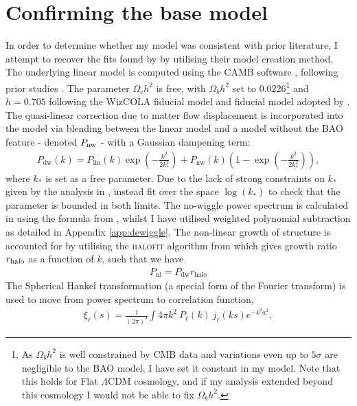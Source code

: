\documentclass[titlesmallcaps, examinerscopy, copyrightpage]{uqthesis}
\begin{document}
\section{Confirming the base model}

In order to determine whether my model was consistent with prior literature, I attempt to recover the fits found by \citet{BlakeKazin2011} by utilising their model creation method. The underlying linear model is computed using the CAMB software \citep{Lewis2000}, following prior studies \citep{BlakeDavis2011, SanchezScoccola2012, ChuangWang2012}. The parameter $\Omega_c h^2$ is free, with $\Omega_b h^2$ set to $0.0226$\footnote{As $\Omega_b h^2$ is well constrained by CMB data and variations even up to $5\sigma$ are negligible to the BAO model, I have set it constant in my model. Note that this holds for Flat $\Lambda$CDM cosmology, and if my analysis extended beyond this cosmology I would not be able to fix $\Omega_b h^2$.} and $h=0.705$ following the WizCOLA fiducial model and fiducial model adopted by \citet{BlakeKazin2011}. The quasi-linear correction due to matter flow displacement is incorporated into the model via blending between the linear model and a model without the BAO feature - denoted $P_{\rm{nw}}$ - with a Gaussian dampening term:
\begin{align}
P_{\text{dw}}(k) = P_{\text{lin}}(k) \exp\left(-\frac{k^2}{2k_*^2}\right)  + P_{\text{nw}}(k) \left(1 - \exp\left(-\frac{k^2}{2k_*^2}\right)\right),
\end{align}
where $k_*$ is set as a free parameter. Due to the lack of strong constraints on $k_*$ given by the analysis in \citet{BlakeKazin2011}, instead fit over the space $\log(k_*)$ to check that the parameter is bounded in both limits. The no-wiggle power spectrum is calculated in \citet{BlakeKazin2011} using the formula from \citet{EisensteinHu1998}, whilst I have utilised weighted polynomial subtraction as detailed in Appendix \ref{app:dewiggle}. The non-linear growth of structure is accounted for by utilising the \textsc{halofit} algorithm from \citet{Smith2003} which gives growth ratio $r_{\rm{halo}}$ as a function of $k$, such that we have
\begin{align}
P_{\text{nl}} = P_{\text{dw}} r_{\text{halo}}
\end{align}
The Spherical Hankel transformation (a special form of the Fourier transform) is used to move from power spectrum to correlation function,
\begin{align}
\xi_\ell(s) = \frac{1}{(2\pi)^3} \int 4\pi k^2 \ P_\ell(k) \ j_\ell(ks) e^{-k^2 a^2},
\end{align}
\end{document}
